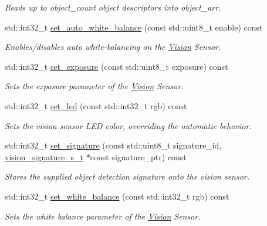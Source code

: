 \begin{DoxyCompactItemize}
\begin{DoxyCompactList}\small\item\em Reads up to object\+\_\+count object descriptors into object\+\_\+arr. \end{DoxyCompactList}\item 
std\+::int32\+\_\+t \mbox{\hyperlink{classpros_1_1Vision_a19cf2d7cf34b763b80da2c6511a61a49}{set\+\_\+auto\+\_\+white\+\_\+balance}} (const std\+::uint8\+\_\+t enable) const
\begin{DoxyCompactList}\small\item\em Enables/disables auto white-\/balancing on the \mbox{\hyperlink{classpros_1_1Vision}{Vision}} Sensor. \end{DoxyCompactList}\item 
std\+::int32\+\_\+t \mbox{\hyperlink{classpros_1_1Vision_a2ad6faaad1abb936f52022022611ac7f}{set\+\_\+exposure}} (const std\+::uint8\+\_\+t exposure) const
\begin{DoxyCompactList}\small\item\em Sets the exposure parameter of the \mbox{\hyperlink{classpros_1_1Vision}{Vision}} Sensor. \end{DoxyCompactList}\item 
std\+::int32\+\_\+t \mbox{\hyperlink{classpros_1_1Vision_ada3f1fdd2cc24c15af26bdd7c17bf604}{set\+\_\+led}} (const std\+::int32\+\_\+t rgb) const
\begin{DoxyCompactList}\small\item\em Sets the vision sensor L\+ED color, overriding the automatic behavior. \end{DoxyCompactList}\item 
std\+::int32\+\_\+t \mbox{\hyperlink{classpros_1_1Vision_a71c3c083ad5538a544e377ebc510cb75}{set\+\_\+signature}} (const std\+::uint8\+\_\+t signature\+\_\+id, \mbox{\hyperlink{vision_8h_a135c729c7277f6cc019c2924088a5fd5}{vision\+\_\+signature\+\_\+s\+\_\+t}} $\ast$const signature\+\_\+ptr) const
\begin{DoxyCompactList}\small\item\em Stores the supplied object detection signature onto the vision sensor. \end{DoxyCompactList}\item 
std\+::int32\+\_\+t \mbox{\hyperlink{classpros_1_1Vision_a923fc18c2b50a42b9c5c6292a476c9b5}{set\+\_\+white\+\_\+balance}} (const std\+::int32\+\_\+t rgb) const
\begin{DoxyCompactList}\small\item\em Sets the white balance parameter of the \mbox{\hyperlink{classpros_1_1Vision}{Vision}} Sensor. \end{DoxyCompactList}\item 

\end{DoxyCompactItemize}
